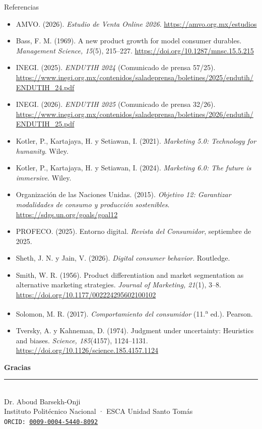 \documentclass[aspectratio=169,xcolor=dvipsnames]{beamer}
\begin{document}
\begin{frame}{Referencias}
\tiny
\begin{itemize}
  \item[] AMVO. (2026). \textit{Estudio de Venta Online 2026}. \url{https://amvo.org.mx/estudios}
  \item[] Bass, F. M. (1969). A new product growth for model consumer durables. \textit{Management Science, 15}(5), 215--227. \url{https://doi.org/10.1287/mnsc.15.5.215}
  \item[] INEGI. (2025). \textit{ENDUTIH 2024} (Comunicado de prensa 57/25). \url{https://www.inegi.org.mx/contenidos/saladeprensa/boletines/2025/endutih/ENDUTIH_24.pdf}
  \item[] INEGI. (2026). \textit{ENDUTIH 2025} (Comunicado de prensa 32/26). \url{https://www.inegi.org.mx/contenidos/saladeprensa/boletines/2026/endutih/ENDUTIH_25.pdf}
  \item[] Kotler, P., Kartajaya, H. y Setiawan, I. (2021). \textit{Marketing 5.0: Technology for humanity}. Wiley.
  \item[] Kotler, P., Kartajaya, H. y Setiawan, I. (2024). \textit{Marketing 6.0: The future is immersive}. Wiley.
  \item[] Organización de las Naciones Unidas. (2015). \textit{Objetivo 12: Garantizar modalidades de consumo y producción sostenibles}. \url{https://sdgs.un.org/goals/goal12}
  \item[] PROFECO. (2025). Entorno digital. \textit{Revista del Consumidor}, septiembre de 2025.
  \item[] Sheth, J. N. y Jain, V. (2026). \textit{Digital consumer behavior}. Routledge.
  \item[] Smith, W. R. (1956). Product differentiation and market segmentation as alternative marketing strategies. \textit{Journal of Marketing, 21}(1), 3--8. \url{https://doi.org/10.1177/002224295602100102}
  \item[] Solomon, M. R. (2017). \textit{Comportamiento del consumidor} (11.\textsuperscript{a} ed.). Pearson.
  \item[] Tversky, A. y Kahneman, D. (1974). Judgment under uncertainty: Heuristics and biases. \textit{Science, 185}(4157), 1124--1131. \url{https://doi.org/10.1126/science.185.4157.1124}
\end{itemize}
\end{frame}

\begin{frame}
    \begin{center}
        {\Large \textcolor{IPNguinda}{\textbf{Gracias}}}\\[6pt]
        {\color{IPNdorado}\rule{0.4\linewidth}{1.2pt}}\\[6pt]
        Dr. Aboud Barsekh-Onji \\
        \small Instituto Politécnico Nacional · ESCA Unidad Santo Tomás \\
        \small \texttt{ORCID: \href{https://orcid.org/0009-0004-5440-8092}{0009-0004-5440-8092}}
    \end{center}
\end{frame}
\end{document}

